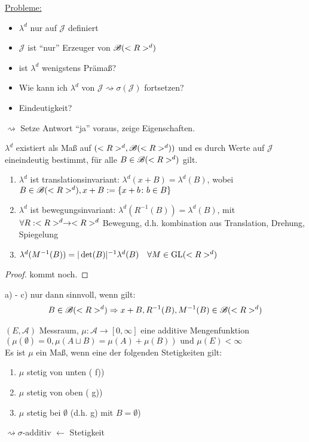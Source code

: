 \underline{Probleme:} 
\begin{itemize}
	\item $\lambda^d$ nur auf $\mathscr{J}$ definiert
	\item $\mathscr{J}$ ist ``nur'' Erzeuger von $\mathscr{B}(<R>^d)$
	\item ist $\lambda^d$ wenigstens Prämaß?
	\item Wie kann ich $\lambda^d$ von $\mathscr{J} \rightsquigarrow \sigma(\mathscr{J})$ fortsetzen?
	\item Eindeutigkeit?
\end{itemize}

$\rightsquigarrow$ Setze Antwort ``ja'' voraus, zeige Eigenschaften.

\begin{proposition}
	$\lambda^d$ existiert als Maß auf $(<R>^d, \mathscr{B}(<R>^d))$ und es durch Werte auf $\mathscr{J}$ eineindeutig bestimmt, für alle $B \in \mathscr{B}(<R>^d)$ gilt.
	\begin{enumerate}[label=(\alph*)]
		\item $\lambda^d$ ist translationsinvariant: $\lambda^d(x+B) = \lambda^d(B)$, wobei $B \in \mathscr{B}(<R>^d), x+B := \{x+b \colon b \in B\}$
		\item $\lambda^d$ ist bewegungsinvariant: $\lambda^d(R^{-1}(B)) = \lambda^d(B)$, mit $\forall R:<R>^d \to <R>^d$ Bewegung, d.h. kombination aus Translation, Drehung, Spiegelung
		\item $\lambda^d(M^{-1}(B)) = \vert \det(B)\vert^{-1} \lambda^d(B)\quad \forall M \in \operatorname{GL}(<R>^d)$
	\end{enumerate}
\end{proposition}

\begin{proof}
	kommt noch. %
\end{proof}

\begin{hint}
	a) - c) nur dann sinnvoll, wenn gilt:
	\begin{align}
		B \in \mathscr{B}(<R>^d) \Rightarrow x+B, R^{-1}(B), M^{-1}(B) \in \mathscr{B}(<R>^d) \notag
	\end{align}
\end{hint}

\begin{lemma}
	$(E, \mathscr{A})$ Messraum, $\mu: \mathscr{A} \to [0, \infty]$ eine additive Mengenfunktion $(\mu(\emptyset) =0, \mu(A\sqcup B) = \mu(A) + \mu(B)) \text{ und } \mu(E) < \infty$\\
	Es ist $\mu$ ein Maß, wenn eine der folgenden Stetigkeiten gilt:
	\begin{enumerate}[label=(\alph*)]
		\item $\mu$ stetig von unten ( f))
		\item $\mu$ stetig von oben ( g))
		\item $\mu$ stetig bei $\emptyset$ (d.h.  g) mit $B = \emptyset$)
	\end{enumerate}
	$\rightsquigarrow \sigma$-additiv $\longleftarrow$ Stetigkeit
\end{lemma}

